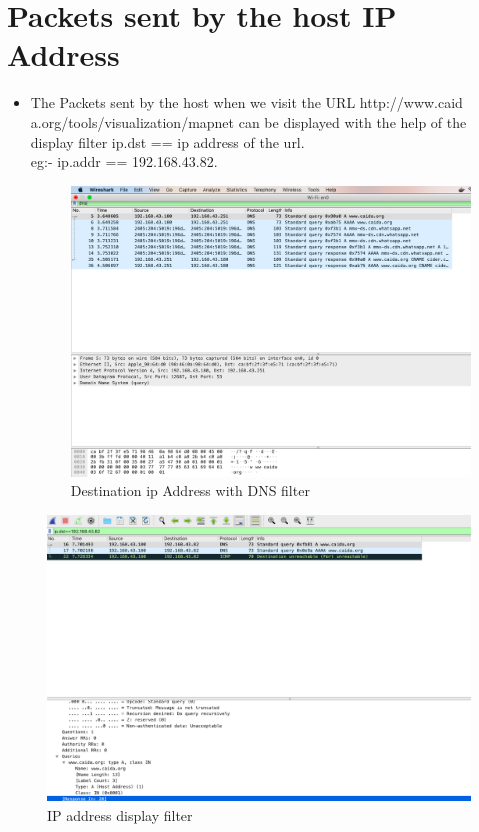 \section{Packets sent by the host IP Address}
\begin{itemize}
\item The Packets sent by the host when we visit the URL http://www.caid a.org/tools/visualization/mapnet can be displayed with the help of the display filter ip.dst == ip address of the url.
\\eg:- ip.addr == 192.168.43.82.
\begin{figure}[H]
\centering
  \includegraphics[width=400pt]{Images/host.png}
  \caption{Destination ip Address with DNS filter}
  \label{fig:2.3}
\end{figure}
\end{itemize}
\begin{figure}[H]
\centering
  \includegraphics[width=400pt]{Images/new.png}
  \caption{IP address display filter }
  \label{fig:2.4}
\end{figure}
